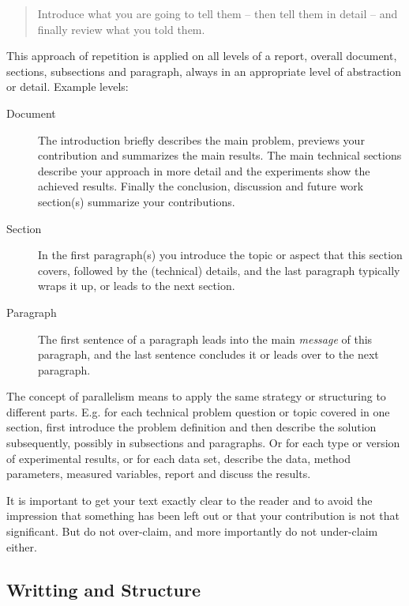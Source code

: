 \documentclass[11pt, a4paper,oneside,chapterprefix=false]{scrbook}
\begin{document}
\begin{quotation}
Introduce what you are going to tell them -- then tell them in detail -- and finally review what you told them.
\end{quotation}

This approach of repetition is applied on all levels of a report, overall document, sections, subsections and paragraph, always in an appropriate level of abstraction or detail. Example levels:

\begin{description}
\item[Document] The introduction briefly describes the main problem, previews your contribution and summarizes the main results. The main technical sections describe your approach in more detail and the experiments show the achieved results. Finally the conclusion, discussion and future work section(s) summarize your contributions.
\item[Section] In the first paragraph(s) you introduce the topic or aspect that this section covers, followed by the (technical) details, and the last paragraph typically wraps it up, or leads to the next section.
\item[Paragraph] The first sentence of a paragraph leads into the main \emph{message} of this paragraph, and the last sentence concludes it or leads over to the next paragraph.
\end{description}

The concept of parallelism means to apply the same strategy or structuring to different parts. E.g. for each technical problem question or topic covered in one section, first introduce the problem definition and then describe the solution subsequently, possibly in subsections and paragraphs. Or for each type or version of experimental results, or for each data set, describe the data, method parameters, measured variables, report and discuss the results.

It is important to get your text exactly clear to the reader and to avoid the impression that something has been left out or that your contribution is not that significant. But do not over-claim, and more importantly do not under-claim either.

\subsection*{Writting and Structure}
\end{document}
